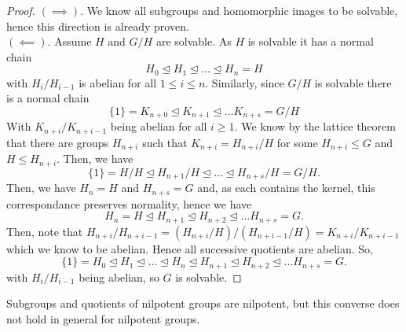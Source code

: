\begin{proof}
	\(\left( \implies \right) \). We know all subgroups and homomorphic images to be solvable, hence this direction is already proven.\\
	\(\left( \impliedby \right) \). Assume \(H\) and \(G / H\) are solvable. As \(H\) is solvable it has a normal chain \[
	H_0 \trianglelefteq H_1 \trianglelefteq \ldots \trianglelefteq H_{n} = H
	\]  with \(H_{i} / H_{i - 1}\) is abelian for all \(1 \le i \le n\). Similarly, since \(G / H\) is solvable there is a normal chain \[
	\{1\}  = K_{n + 0} \trianglelefteq K_{n + 1} \trianglelefteq \ldots K_{n + s} = G / H
	\]
	With \(K_{n + i} / K_{n + i - 1}\) being abelian for all \(i \ge 1\). We know by the lattice theorem that there are groups \(H_{n + i}\) such that \(K_{ n + i} = H_{n + i} / H\) for some \(H _{n + i} \le G\) and \(H \le H_{n + i}\). Then, we have \[
	\{1\}  = H / H \trianglelefteq H_{n + 1} / H \trianglelefteq \ldots \trianglelefteq H_{n + s} / H = G / H
	.\]
	Then, we have \(H_{n} = H\) and \(H_{n + s} = G\) and, as each contains the kernel, this correspondance preserves normality, hence we have \[
	H_{n} = H\trianglelefteq H_{n + 1} \trianglelefteq H_{n + 2} \trianglelefteq \ldots H_{n + s}  = G
	.\]
	Then, note that \(H_{ n + i} / H_{ n + i - 1} = \left( H_{n + i} / H \right) / \left( H_{n + i - 1} / H \right) = K_{n + i} / K_{n + i - 1} \) which we know to be abelian. Hence all successive quotients are abelian. So, \[
	\{1\}  = H_0 \trianglelefteq H_1 \trianglelefteq \ldots \trianglelefteq H_{n} \trianglelefteq H_{n + 1} \trianglelefteq H_{ n + 2} \trianglelefteq \ldots H_{n + s} = G
	.\]
	with \(H_{i} / H_{ i - 1}\) being abelian, so \(G\) is solvable.
\end{proof}
\begin{remark}
	Subgroups and quotients of nilpotent groups are nilpotent, but this converse does not hold in general for nilpotent groups.
\end{remark}
